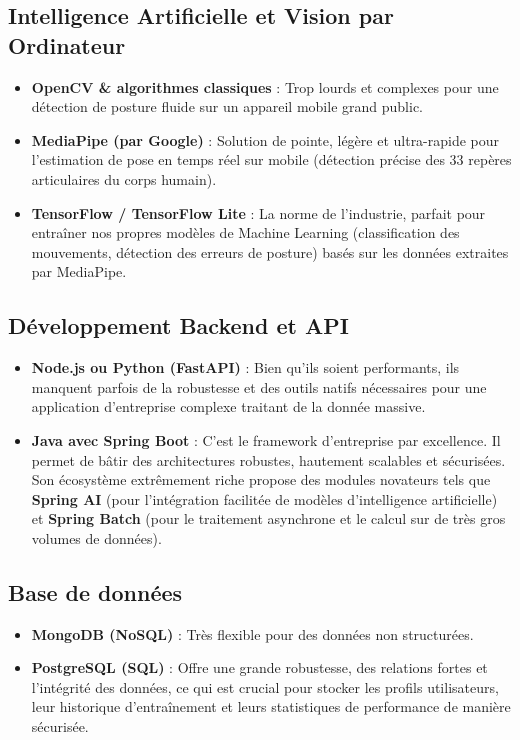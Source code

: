 \subsection{Intelligence Artificielle et Vision par Ordinateur}
\begin{itemize}
    \item \textbf{OpenCV \& algorithmes classiques} : Trop lourds et complexes pour une détection de posture fluide sur un appareil mobile grand public.
    \item \textbf{MediaPipe (par Google)} : Solution de pointe, légère et ultra-rapide pour l'estimation de pose en temps réel sur mobile (détection précise des 33 repères articulaires du corps humain).
    \item \textbf{TensorFlow / TensorFlow Lite} : La norme de l'industrie, parfait pour entraîner nos propres modèles de Machine Learning (classification des mouvements, détection des erreurs de posture) basés sur les données extraites par MediaPipe.
\end{itemize}

\subsection{Développement Backend et API}
\begin{itemize}
    \item \textbf{Node.js ou Python (FastAPI)} : Bien qu'ils soient performants, ils manquent parfois de la robustesse et des outils natifs nécessaires pour une application d'entreprise complexe traitant de la donnée massive.
    \item \textbf{Java avec Spring Boot} : C'est le framework d'entreprise par excellence. Il permet de bâtir des architectures robustes, hautement scalables et sécurisées. Son écosystème extrêmement riche propose des modules novateurs tels que \textbf{Spring AI} (pour l'intégration facilitée de modèles d'intelligence artificielle) et \textbf{Spring Batch} (pour le traitement asynchrone et le calcul sur de très gros volumes de données).
\end{itemize}

\subsection{Base de données}
\begin{itemize}
    \item \textbf{MongoDB (NoSQL)} : Très flexible pour des données non structurées.
    \item \textbf{PostgreSQL (SQL)} : Offre une grande robustesse, des relations fortes et l'intégrité des données, ce qui est crucial pour stocker les profils utilisateurs, leur historique d'entraînement et leurs statistiques de performance de manière sécurisée.
\end{itemize}

